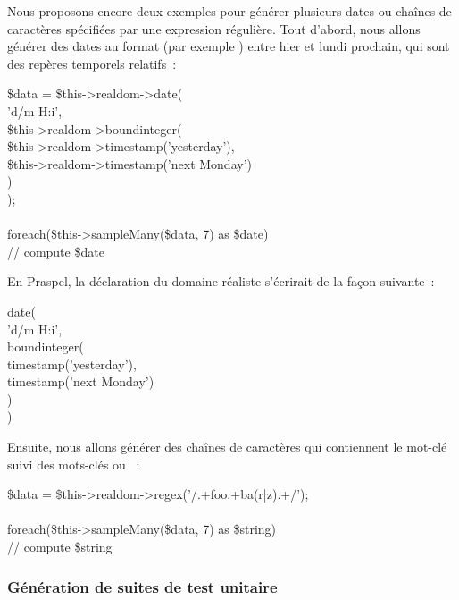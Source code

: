 \begin{example}

Nous proposons encore deux exemples pour générer plusieurs dates ou chaînes de
caractères spécifiées par une expression régulière. Tout d'abord, nous allons
générer des dates au format  (par exemple )
entre hier et lundi prochain, qui sont des repères temporels relatifs~:

%
\begin{pre}
\$data = \$this->realdom->date( \\
    'd/m H:i', \\
    \$this->realdom->boundinteger( \\
        \$this->realdom->timestamp('yesterday'), \\
        \$this->realdom->timestamp('next Monday') \\
    ) \\
); \\
 \\
foreach(\$this->sampleMany(\$data, 7) as \$date) \\
    // compute \$date
\end{pre}
%
En Praspel, la déclaration du domaine réaliste s'écrirait de la façon suivante~:
%
\begin{pre}
date( \\
    'd/m H:i', \\
    boundinteger( \\
        timestamp('yesterday'), \\
        timestamp('next Monday') \\
    ) \\
)
\end{pre}
%
Ensuite, nous allons générer des chaînes de caractères qui contiennent
le mot-clé  suivi des mots-clés  ou ~:
%
\begin{pre}
\$data = \$this->realdom->regex('/.+foo.+ba(r|z).+/'); \\
 \\
foreach(\$this->sampleMany(\$data, 7) as \$string) \\
    // compute \$string
\end{pre}

\end{example}

\subsubsection{Génération de suites de test unitaire}

